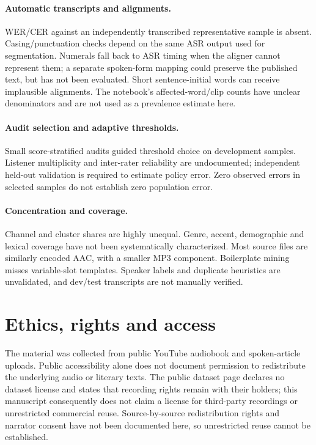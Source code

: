 \documentclass[11pt,a4paper]{article}
\begin{document}
\paragraph{Automatic transcripts and alignments.}
WER/CER against an independently transcribed representative sample is absent.
Casing/punctuation checks depend on the same ASR output used for segmentation.
Numerals fall back to ASR timing when the aligner cannot represent them; a
separate spoken-form mapping could preserve the published text, but has not
been evaluated. Short sentence-initial words can receive implausible
alignments. The notebook's affected-word/clip counts have unclear denominators
and are not used as a prevalence estimate here.

\paragraph{Audit selection and adaptive thresholds.}
Small score-stratified audits guided threshold choice on development samples.
Listener multiplicity and inter-rater reliability are undocumented; independent
held-out validation is required to estimate policy error. Zero observed errors
in selected samples do not establish zero population error.

\paragraph{Concentration and coverage.}
Channel and cluster shares are highly unequal. Genre, accent, demographic and
lexical coverage have not been systematically characterized. Most source files
are similarly encoded AAC, with a smaller MP3 component. Boilerplate mining
misses variable-slot templates. Speaker labels and duplicate heuristics are
unvalidated, and dev/test transcripts are not manually verified.

\section{Ethics, rights and access}
\label{sec:ethics}
The material was collected from public YouTube audiobook and spoken-article
uploads. Public accessibility alone does not document permission to redistribute
the underlying audio or literary texts. The public dataset page declares no
dataset license and states that recording rights remain with their holders;
this manuscript consequently does not claim a license for third-party
recordings or unrestricted commercial reuse. Source-by-source redistribution rights and narrator consent have not been
documented here, so unrestricted reuse cannot be established.
\end{document}
